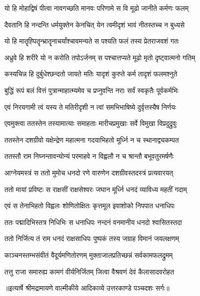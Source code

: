 \twolineshloka
{यो हि मोहाद्विषं पीत्वा नावगच्छति मानवः}
{परिणामे स वि मूढो जानीते कर्मणः फलम्} %

\twolineshloka
{दैवतानि हि नन्दन्ति धर्मयुक्तेन केनचित्}
{येन त्वमीदृशं भावं नीतस्तच्च न बुध्यसे} %

\twolineshloka
{यो हि मातॄह्पितॄन्भ्रातॄनाचर्यांश्चावमन्यते}
{स पश्यति फलं तस्य प्रेतराजवशं गतः} %

\twolineshloka
{अध्रुवे हि शरीरे यो न करोति तपोऽर्जनम्}
{स पश्चात्तप्यते मूढो मृतो दृष्ट्वात्मनो गतिम्} %

\twolineshloka
{कस्यचिन्न हि दुर्बुधेश्छन्दतो जायते मतिः}
{यादृशं कुरुते कर्म तादृशं फलमश्नुते} %

\twolineshloka
{बुद्धिं रूपं बलं वित्तं पुत्रान्माहात्म्यमेव च}
{प्रप्नुवन्ति नराः सर्वं स्वकृतैः पूर्वकर्मभिः} %

\twolineshloka
{एवं निरयगामी त्वं यस्य ते मतिरीदृशी}
{न त्वां समभिभाषिष्ये दुर्वृत्तस्यैष निर्णयः} %

\twolineshloka
{एवमुक्त्वा ततस्तेन तस्यामात्याः समाहताः}
{मारीचप्रमुखाः सर्वे विमुखा विप्रदुद्रुवुः} %

\twolineshloka
{ततस्तेन दशग्रीवो यक्षेन्द्रेण महात्मना}
{गदयाभिहतो मूर्ध्नि न च स्थानाद्व्यकम्पत} %

\twolineshloka
{ततस्तौ राम निघ्नन्तावन्योन्यं परमाहवे}
{न विह्वलौ न च श्रान्तौ बभूवतुरमर्षणैः} %

\twolineshloka
{आग्नेयमस्त्रं स ततो मुमोच धनदो रणे}
{वारुणेन दशग्रीवस्तदस्त्रं प्रत्यवारयत्} %

\twolineshloka
{ततो मायां प्रविष्टः स राक्षसीं राक्षसेश्वरः}
{जघान मूर्ध्नि धनदं व्याविध्य महतीं गदाम्} %

\twolineshloka
{एवं स तेनाभिहतो विह्वलः शोणितोक्षितः}
{कृत्तमूल इवाशोको निपपात धनाधिपः} %

\twolineshloka
{ततः पद्मादिभिस्तत्र निधिभिः स धनाधिपः}
{नन्दनं वनमानीय धनदो श्वासितस्तदा} %

\twolineshloka
{ततो निर्जित्य तं राम धनदं राक्षसाधिपः}
{पुष्पकं तस्य जग्राह विमानं जयलक्षणम्} %

\twolineshloka
{काञ्चनस्तम्भसंवीतं वैदूर्यमणितोरणम्}
{मुक्ताजालप्रतिच्छन्नं सर्वकामफलद्रुमम्} %

\twolineshloka
{तत्तु राजा समारुह्य कामगं वीर्यनिर्जितम्}
{जित्वा वैश्रवणं देवं कैलासादवरोहत} %


{॥इत्यार्षे श्रीमद्रामायणे वाल्मीकीये आदिकाव्ये उत्तरकाण्डे पञ्चदशः सर्गः॥}

